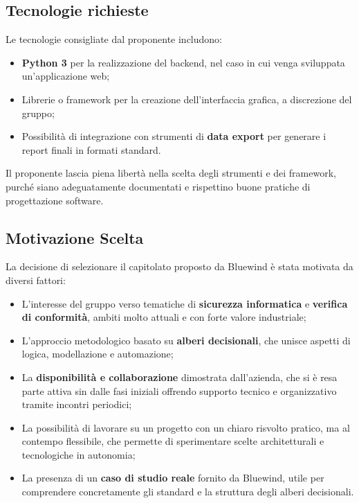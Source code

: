 \documentclass[a4paper,12pt]{article}
\begin{document}
{    \subsection{Tecnologie richieste}
        Le tecnologie consigliate dal proponente includono:
        \begin{itemize}
            \item \textbf{Python 3} per la realizzazione del backend, nel caso in cui venga sviluppata un’applicazione web;
            \item Librerie o framework per la creazione dell’interfaccia grafica, a discrezione del gruppo;
            \item Possibilità di integrazione con strumenti di \textbf{data export} per generare i report finali in formati standard.
        \end{itemize}
        Il proponente lascia piena libertà nella scelta degli strumenti e dei framework, purché siano adeguatamente documentati e rispettino buone pratiche di progettazione software.
    

    \subsection{Motivazione Scelta}
        La decisione di selezionare il capitolato proposto da Bluewind è stata motivata da diversi fattori:
        \begin{itemize}
            \item L’interesse del gruppo verso tematiche di \textbf{sicurezza informatica} e \textbf{verifica di conformità}, ambiti molto attuali e con forte valore industriale;
            \item L’approccio metodologico basato su \textbf{alberi decisionali}, che unisce aspetti di logica, modellazione e automazione;
            \item La \textbf{disponibilità e collaborazione} dimostrata dall’azienda, che si è resa parte attiva sin dalle fasi iniziali offrendo supporto tecnico e organizzativo tramite incontri periodici;
            \item La possibilità di lavorare su un progetto con un chiaro risvolto pratico, ma al contempo flessibile, che permette di sperimentare scelte architetturali e tecnologiche in autonomia;
            \item La presenza di un \textbf{caso di studio reale} fornito da Bluewind, utile per comprendere concretamente gli standard e la struttura degli alberi decisionali.
        \end{itemize}
    

}
\end{document}
